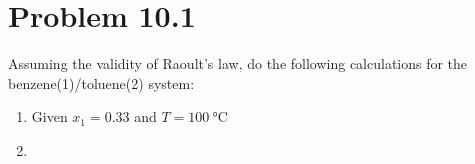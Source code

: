 \documentclass{article}
\begin{document}
\section*{Problem 10.1}
Assuming the validity of Raoult's law, do the following calculations
for the benzene(1)/toluene(2) system:
\begin{enumerate}
  \item Given $x_1=0.33$ and $T=100~\unit{\degreeCelsius}$ \\
  \item
\end{enumerate}
\end{document}
